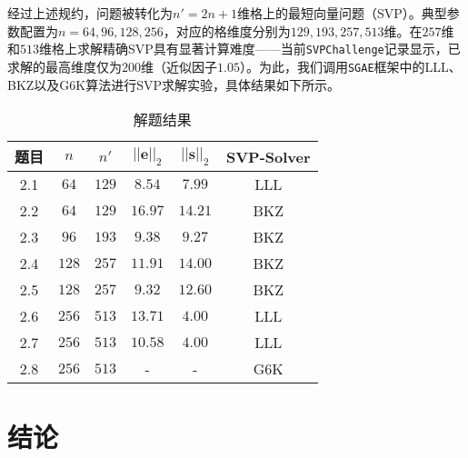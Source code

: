 \documentclass[12pt,a4paper]{article}
\numberwithin{equation}{section}
\begin{document}
经过上述规约，问题被转化为$n'=2n+1$维格上的最短向量问题（SVP）。典型参数配置为$n=64,96,128,256$，对应的格维度分别为$129,193,257,513$维。在$257$维和$513$维格上求解精确SVP具有显著计算难度——当前\texttt{SVPChallenge}记录显示，已求解的最高维度仅为$200$维（近似因子$1.05$）。为此，我们调用\texttt{SGAE}框架中的LLL、BKZ以及G6K算法进行SVP求解实验，具体结果如下所示。

\begin{table}[htbp]
  \centering
  \caption{解题结果}
  \label{tab:svp-performance}
  \begin{tabular}{|c|c|c|c|c|c|}
    \hline
    题目 & $n$ &$n'$&$||\mathbf{e}||_2$ & $||\mathbf{s}||_2$ &SVP-Solver \\
    \hline
    2.1 &$64$ & $129$& $8.54$  & $7.99$   & LLL \\
    2.2 &$64$ & $129$& $16.97$ & $14.21$  & BKZ \\
    2.3 &$96$ & $193$& $9.38$  & $9.27$   & BKZ \\
    2.4 &$128$& $257$& $11.91$ & $14.00$  & BKZ \\
    2.5 &$128$& $257$& $9.32$  & $12.60$  & BKZ \\
    2.6 &$256$& $513$& $13.71$ & $4.00$   & LLL \\
    2.7 &$256$& $513$& $10.58$ & $4.00$   & LLL \\
    2.8 &$256$& $513$& -       & -        & G6K \\
    \hline
  \end{tabular}
\end{table}

\section{结论}


\end{document}
